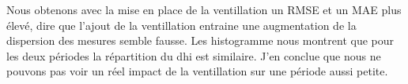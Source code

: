 \documentclass[12pt,a4paper]{article}
\begin{document}
\begin{flushleft}
Nous obtenons avec la mise en place de la ventillation un RMSE et un MAE plus élevé, dire que l'ajout de la ventillation entraine une augmentation de la dispersion des mesures semble fausse. Les histogramme nous montrent que pour les deux périodes la répartition du dhi est similaire. J'en conclue que nous ne pouvons pas voir un réel impact de la ventillation sur une période aussi petite.





\end{flushleft}






\end{document}
